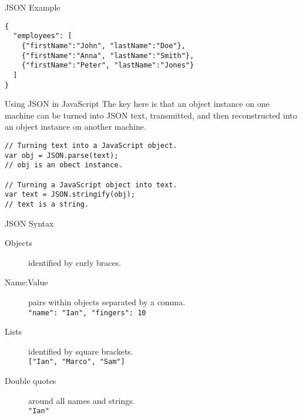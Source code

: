 \begin{frame}[fragile]{JSON Example}
  \begin{verbatim}
{
  "employees": [
    {"firstName":"John", "lastName":"Doe"},
    {"firstName":"Anna", "lastName":"Smith"},
    {"firstName":"Peter", "lastName":"Jones"}
  ]
}
  \end{verbatim}
\end{frame}


\begin{frame}[fragile]{Using JSON in JavaScript}
  The key here is that an object instance on one machine can be turned into JSON text, transmitted, and then reconstructed into an object instance on another machine. 
  \begin{verbatim}
// Turning text into a JavaScript object.
var obj = JSON.parse(text);
// obj is an obect instance.

// Turning a JavaScript object into text.
var text = JSON.stringify(obj);
// text is a string.
  \end{verbatim}
\end{frame}

\begin{frame}{JSON Syntax}
  \begin{description}
    \item[Objects] identified by curly braces. \\
    \hspace{0.5cm} \texttt{{}}
    \item[Name:Value] pairs within objects separated by a comma. \\
    \hspace{0.5cm} \texttt{{"name": "Ian", "fingers": 10}}
    \item[Lists] identified by square brackets. \\
    \hspace{0.5cm} \texttt{["Ian", "Marco", "Sam"]}
    \item[Double quotes] around all names and strings. \\
    \hspace{0.5cm} \texttt{"Ian"}
  \end{description}
\end{frame}

